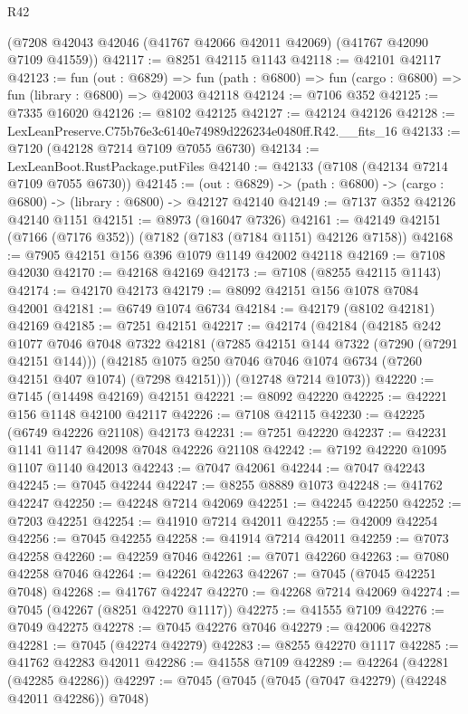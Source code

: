 \begin{lexlean}{R42}
\begin{coremodule}
{    (@7208 @42043 @42046 (@41767 @42066 @42011 @42069) (@41767 @42090 @7109 @41559))
@42117 := @8251 @42115 @1143
@42118 := @42101 @42117
@42123 := fun (out : @6829) =>
  fun (path : @6800) => fun (cargo : @6800) => fun (library : @6800) => @42003 @42118
@42124 := @7106 @352
@42125 := @7335 @16020
@42126 := @8102 @42125
@42127 := @42124 @42126
@42128 := LexLeanPreserve.C75b76e3c6140e74989d226234e0480ff.R42.__fits_16
@42133 := @7120 (@42128 @7214 @7109 @7055 @6730)
@42134 := LexLeanBoot.RustPackage.putFiles
@42140 := @42133 (@7108 (@42134 @7214 @7109 @7055 @6730))
@42145 := (out : @6829) -> (path : @6800) -> (cargo : @6800) -> (library : @6800) -> @42127 @42140
@42149 := @7137 @352 @42126 @42140 @1151
@42151 := @8973 (@16047 @7326)
@42161 := @42149 @42151 (@7166 (@7176 @352)) (@7182 (@7183 (@7184 @1151) @42126 @7158))
@42168 := @7905 @42151 @156 @396 @1079 @1149 @42002 @42118
@42169 := @7108 @42030
@42170 := @42168 @42169
@42173 := @7108 (@8255 @42115 @1143)
@42174 := @42170 @42173
@42179 := @8092 @42151 @156 @1078 @7084 @42001
@42181 := @6749 @1074 @6734
@42184 := @42179 (@8102 @42181) @42169
@42185 := @7251 @42151
@42217 := @42174
    (@42184
      (@42185
        @242
        @1077
        @7046
        @7048
        @7322
        @42181
        (@7285 @42151 @144 @7322 (@7290 (@7291 @42151 @144)))
        (@42185 @1075 @250 @7046 @7046 @1074 @6734 (@7260 @42151 @407 @1074) (@7298 @42151)))
      (@12748 @7214 @1073))
@42220 := @7145 (@14498 @42169) @42151
@42221 := @8092 @42220
@42225 := @42221 @156 @1148 @42100 @42117
@42226 := @7108 @42115
@42230 := @42225 (@6749 @42226 @21108) @42173
@42231 := @7251 @42220
@42237 := @42231 @1141 @1147 @42098 @7048 @42226 @21108
@42242 := @7192 @42220 @1095 @1107 @1140 @42013
@42243 := @7047 @42061
@42244 := @7047 @42243
@42245 := @7045 @42244
@42247 := @8255 @8889 @1073
@42248 := @41762 @42247
@42250 := @42248 @7214 @42069
@42251 := @42245 @42250
@42252 := @7203 @42251
@42254 := @41910 @7214 @42011
@42255 := @42009 @42254
@42256 := @7045 @42255
@42258 := @41914 @7214 @42011
@42259 := @7073 @42258
@42260 := @42259 @7046
@42261 := @7071 @42260
@42263 := @7080 @42258 @7046
@42264 := @42261 @42263
@42267 := @7045 (@7045 @42251 @7048)
@42268 := @41767 @42247
@42270 := @42268 @7214 @42069
@42274 := @7045 (@42267 (@8251 @42270 @1117))
@42275 := @41555 @7109
@42276 := @7049 @42275
@42278 := @7045 @42276 @7046
@42279 := @42006 @42278
@42281 := @7045 (@42274 @42279)
@42283 := @8255 @42270 @1117
@42285 := @41762 @42283 @42011
@42286 := @41558 @7109
@42289 := @42264 (@42281 (@42285 @42286))
@42297 := @7045 (@7045 (@7045 (@7047 @42279) (@42248 @42011 @42286)) @7048)
}
\end{coremodule}
\end{lexlean}

